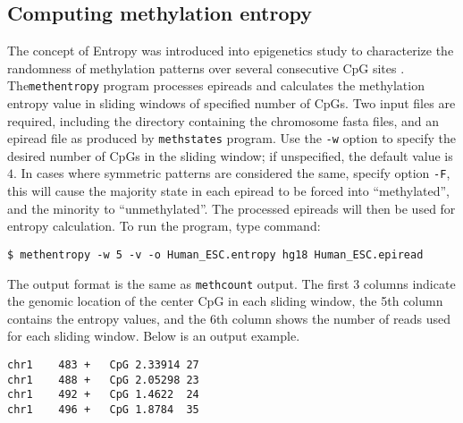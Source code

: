 \documentclass[10pt]{article}
\newcommand{\prog}[1]{\texttt{#1}}
\newcommand{\op}[1]{\texttt{#1}}
\begin{document}
{{%







\subsection{Computing methylation entropy}
\label{sec:methentropy}
The concept of Entropy was introduced into epigenetics study to
characterize the randomness of methylation patterns over several
consecutive CpG sites \cite{xie2011}. The\prog{methentropy} program
processes epireads and calculates the methylation entropy value in
sliding windows of specified number of CpGs. Two input files are
required, including the directory containing the chromosome fasta
files, and an epiread file as produced by \prog{methstates}
program. Use the \op{-w} option to specify the desired number of CpGs
in the sliding window; if unspecified, the default value is $4$. In
cases where symmetric patterns are considered the same, specify option
\op{-F}, this will cause the majority state in each epiread to be
forced into ``methylated'', and the minority to ``unmethylated''. The
processed epireads will then be used for entropy calculation. To run
the program, type command:
\begin{verbatim}
$ methentropy -w 5 -v -o Human_ESC.entropy hg18 Human_ESC.epiread
\end{verbatim} 
The output format is the same as \prog{methcount} output. The first 3
columns indicate the genomic location of the center CpG in each
sliding window, the 5th column contains the entropy values, and the
6th column shows the number of reads used for each sliding
window. Below is an output example.
\begin{verbatim}
chr1	483	+	CpG	2.33914	27
chr1	488	+	CpG	2.05298	23
chr1	492	+	CpG	1.4622	24
chr1	496	+	CpG	1.8784	35
\end{verbatim}




}}
\end{document}

